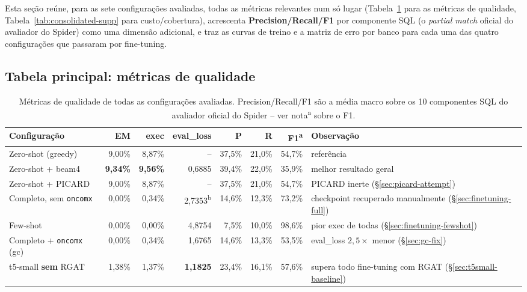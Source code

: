 Esta seção reúne, para as sete configurações avaliadas, todas as métricas
relevantes num só lugar (Tabela~\ref{tab:consolidated-main} para as
métricas de qualidade, Tabela~\ref{tab:consolidated-supp} para custo/cobertura),
acrescenta \textbf{Precision/Recall/F1} por componente SQL (o \emph{partial
match} oficial do avaliador do Spider) como uma dimensão adicional, e traz
as curvas de treino e a matriz de erro por banco para cada uma das quatro
configurações que passaram por fine-tuning.

\subsection{Tabela principal: métricas de qualidade}

\begin{table}[h]
\centering
\caption{Métricas de qualidade de todas as configurações avaliadas. Precision/Recall/F1 são a média macro sobre os 10 componentes SQL do avaliador oficial do Spider -- ver nota\textsuperscript{a} sobre o F1.}
\label{tab:consolidated-main}
\begin{tabular}{lrrrrrrl}
\toprule
\textbf{Configuração} & \textbf{EM} & \textbf{exec} & \textbf{eval\_loss} & \textbf{P} & \textbf{R} & \textbf{F1}\textsuperscript{a} & \textbf{Observação} \\
\midrule
Zero-shot (greedy)              & 9,00\%  & 8,87\%  & --     & 37,5\% & 21,0\% & 54,7\% & referência \\
Zero-shot + beam4                & \textbf{9,34\%}  & \textbf{9,56\%}  & 0,6885 & 39,4\% & 22,0\% & 35,9\% & melhor resultado geral \\
Zero-shot + PICARD               & 9,00\%  & 8,87\%  & --     & 37,5\% & 21,0\% & 54,7\% & PICARD inerte (\S\ref{sec:picard-attempt}) \\
Completo, sem \texttt{oncomx}    & 0,00\%  & 0,34\%  & 2,7353\textsuperscript{b} & 14,6\% & 12,3\% & 73,2\% & checkpoint recuperado manualmente (\S\ref{sec:finetuning-full}) \\
Few-shot                         & 0,00\%  & 0,00\%  & 4,8754 & 7,5\%  & 10,0\% & 98,6\% & pior exec de todas (\S\ref{sec:finetuning-fewshot}) \\
Completo + \texttt{oncomx} (gc)  & 0,00\%  & 0,34\%  & 1,6765 & 14,6\% & 13,3\% & 53,5\% & eval\_loss $2,5\times$ menor (\S\ref{sec:gc-fix}) \\
t5-small \textbf{sem} RGAT        & 1,38\%  & 1,37\%  & \textbf{1,1825} & 23,4\% & 16,1\% & 57,6\% & supera todo fine-tuning com RGAT (\S\ref{sec:t5small-baseline}) \\
\bottomrule
\end{tabular}


\end{table}
